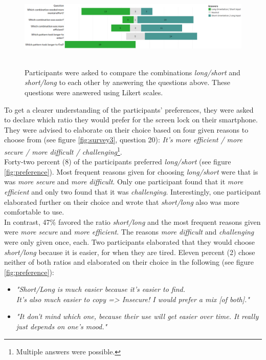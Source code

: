 \begin{figure}[t!]
\centering
\includegraphics[width=15cm, height=4cm]{Chapters/graphics/Likert2.png}
\caption{Participants were asked to compare the combinations \textit{long/short} and \textit{short/long} to each other by answering the questions above. These questions were answered using Likert scales. }
\label{fig:likert2}
\end{figure}

To get a clearer understanding of the participants' preferences, they were asked to declare which ratio they would prefer for the screen lock on their smartphone. They were advised to elaborate on their choice based on four given reasons to choose from (see figure \ref{fig:survey3}, question 20): \textit{It's more efficient / more secure / more difficult / challenging}\footnote{Multiple answers were possible.}.\\
Forty-two percent (8) of the participants preferred \textit{long/short} (see figure \ref{fig:preference}). Most frequent reasons given for choosing \textit{long/short} were that is was \textit{more secure} and \textit{more difficult}. Only one participant found that it \textit{more efficient} and only two found that it was \textit{challenging}. Interestingly, one participant elaborated further on their choice and wrote that \textit{short/long} also was more comfortable to use.\\

In contrast, 47\% favored the ratio \textit{short/long} and the most frequent reasons given were \textit{more secure} and \textit{more efficient}. The reasons \textit{more difficult} and \textit{challenging} were only given once, each. Two participants elaborated that they would choose \textit{short/long} because it is easier, for when they are tired. Eleven percent (2) chose neither of both ratios and elaborated on their choice in the following (see figure \ref{fig:preference}): 
\begin{itemize}
    \item \textit{"Short/Long is much easier because it's easier to find.\\ It's also much easier to copy => Insecure! I would prefer a mix [of both]."}
    \item \textit{"It don't mind which one, because their use will get easier over time. It really just depends on one's mood."} 
\end{itemize}


